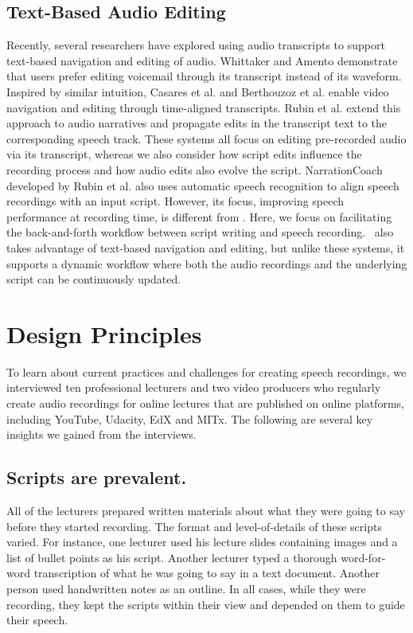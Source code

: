 \subsection{Text-Based Audio Editing}
Recently, several researchers have explored using audio transcripts to support text-based navigation and editing of audio. Whittaker and Amento \cite{whittaker2004semantic} demonstrate that users prefer editing voicemail through its transcript instead of its waveform. Inspired by similar intuition, Casares et al. \cite{casares2002simplifying} and Berthouzoz et al. \cite{berthouzoz2012tools} enable video navigation and editing through time-aligned transcripts. Rubin et al. \cite{rubin2013content} extend this approach to audio narratives and propagate edits in the transcript text to the corresponding speech track. These systems all focus on editing pre-recorded audio via its transcript, whereas we also consider how script edits influence the recording process and how audio edits also evolve the script. NarrationCoach developed by Rubin et al. \cite{rubin2015capture} also uses automatic speech recognition to align speech recordings with an input script. However, its focus, improving speech performance at recording time, is different from \voicescript. Here, we focus on facilitating the back-and-forth workflow between script writing and speech recording. \voicescript\ also takes advantage of text-based navigation and editing, but unlike these systems, it supports a dynamic workflow where both the audio recordings and the underlying script can be continuously updated.      

\section{Design Principles}
To learn about current practices and challenges for creating speech recordings, we interviewed ten professional lecturers and two video producers who regularly create audio recordings for online lectures that are published on online platforms, including YouTube, Udacity, EdX and MITx. The following are several key insights we gained from the interviews.\\

\subsection*{Scripts are prevalent.} 
All of the lecturers prepared written materials about what they were going to say before they started recording. The format and level-of-details of these scripts varied. For instance, one lecturer used his lecture slides containing images and a list of bullet points as his script. Another lecturer typed a thorough word-for-word transcription of what he was going to say in a text document. Another person used handwritten notes as an outline. In all cases, while they were recording, they kept the scripts within their view and depended on them to guide their speech.  

